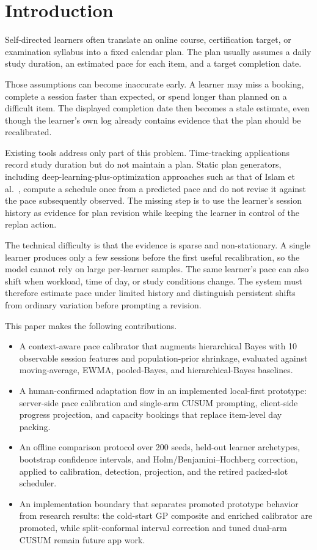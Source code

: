 \documentclass[conference]{IEEEtran}
\begin{document}
\section{Introduction}
Self-directed learners often translate an online course, certification target, or examination syllabus into a fixed calendar plan. The plan usually assumes a daily study duration, an estimated pace for each item, and a target completion date.

Those assumptions can become inaccurate early. A learner may miss a booking, complete a session faster than expected, or spend longer than planned on a difficult item. The displayed completion date then becomes a stale estimate, even though the learner's own log already contains evidence that the plan should be recalibrated.

Existing tools address only part of this problem. Time-tracking applications record study duration but do not maintain a plan. Static plan generators, including deep-learning-plus-optimization approaches such as that of Islam et al.~\cite{islam2024}, compute a schedule once from a predicted pace and do not revise it against the pace subsequently observed. The missing step is to use the learner's session history as evidence for plan revision while keeping the learner in control of the replan action.

The technical difficulty is that the evidence is sparse and non-stationary. A single learner produces only a few sessions before the first useful recalibration, so the model cannot rely on large per-learner samples. The same learner's pace can also shift when workload, time of day, or study conditions change. The system must therefore estimate pace under limited history and distinguish persistent shifts from ordinary variation before prompting a revision.

This paper makes the following contributions.
\begin{itemize}
\item A context-aware pace calibrator that augments hierarchical Bayes with 10 observable session features and population-prior shrinkage, evaluated against moving-average, EWMA, pooled-Bayes, and hierarchical-Bayes baselines.
\item A human-confirmed adaptation flow in an implemented local-first prototype: server-side pace calibration and single-arm CUSUM prompting, client-side progress projection, and capacity bookings that replace item-level day packing.
\item An offline comparison protocol over 200 seeds, held-out learner archetypes, bootstrap confidence intervals, and Holm/Benjamini--Hochberg correction, applied to calibration, detection, projection, and the retired packed-slot scheduler.
\item An implementation boundary that separates promoted prototype behavior from research results: the cold-start GP composite and enriched calibrator are promoted, while split-conformal interval correction and tuned dual-arm CUSUM remain future app work.
\end{itemize}
\end{document}
